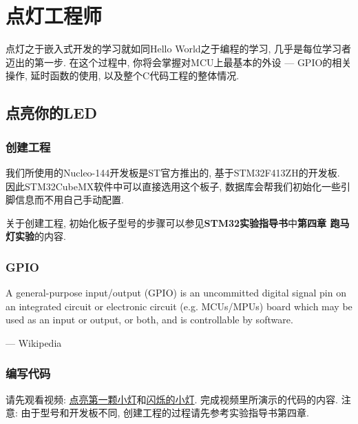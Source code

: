 \chapter{点灯工程师}

点灯之于嵌入式开发的学习就如同Hello World之于编程的学习, 几乎是每位学习者迈出的第一步. 在这个过程中, 你将会掌握对MCU上最基本的外设 --- GPIO的相关操作, 延时函数的使用, 以及整个C代码工程的整体情况.

\section{点亮你的LED}

\subsection{创建工程}

我们所使用的Nucleo-144开发板是ST官方推出的, 基于STM32F413ZH的开发板. 因此STM32CubeMX软件中可以直接选用这个板子, 数据库会帮我们初始化一些引脚信息而不用自己手动配置.

关于创建工程, 初始化板子型号的步骤可以参见\textbf{STM32实验指导书}中\textbf{第四章 跑马灯实验}的内容.

\subsection{GPIO}

\begin{definition}
	A general-purpose input/output (GPIO) is an uncommitted digital signal pin on an integrated circuit or electronic circuit (e.g. MCUs/MPUs) board which may be used as an input or output, or both, and is controllable by software.

	--- Wikipedia
\end{definition}

\subsection{编写代码}


请先观看视频: \href{https://www.bilibili.com/video/BV1s84y1h77Q/?share_source=copy_web&vd_source=b25682b699c98b1c6e3947c9b7b66a3a}{点亮第一颗小灯}和\href{https://www.bilibili.com/video/BV1Cd4y1L7kH/?spm_id_from=333.788&vd_source=f1ae41cbb2101ee1a2a77931d719f1be}{闪烁的小灯}. 完成视频里所演示的代码的内容. 注意: 由于型号和开发板不同, 创建工程的过程请先参考实验指导书第四章.

